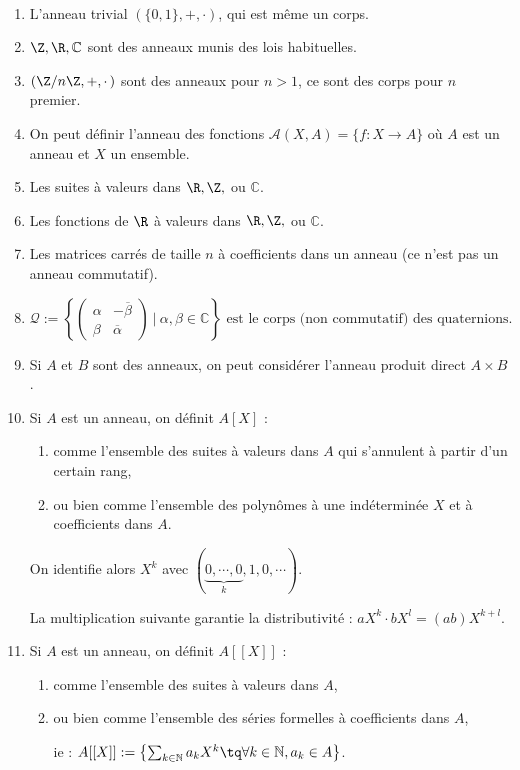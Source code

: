 \begin{example}[Exemples]\ 

\begin{enumerate}
 \item L'anneau trivial $(\{0,1\},+,\cdotp)$, qui est même un corps.
\item $\Z, \R, \mathbb{C}$ sont des anneaux munis des lois habituelles.
\item $(\Z / n\Z, +,\cdotp)$ sont des anneaux pour $n > 1$, ce sont des corps
pour $n$ premier.
\item On peut définir l'anneau des fonctions $\mathcal{A}(X,A) =
\{f:X\rightarrow A\}$ où $A$ est un
anneau et $X$ un ensemble.
\item Les suites à valeurs dans $\R, \Z,$ ou $ \mathbb{C}$.
\item Les fonctions de $\R$ à valeurs dans $\R, \Z,$ ou $\mathbb{C}$.
\item Les matrices carrés de taille $n$ à coefficients dans un anneau (ce n'est
pas un anneau commutatif).
\item \begin{displaymath}
       \mathcal{Q} := \left\lbrace \begin{pmatrix}
                               \alpha & -\overline{\beta} \\
                               \beta  & \overline{\alpha}
                              \end{pmatrix} \ \Big|\  \alpha,\beta
\in\mathbb{C} \right\rbrace \text{ est le corps (non commutatif) des
quaternions.}
      \end{displaymath}
\item Si $A$ et $B$ sont des anneaux, on peut considérer l'anneau produit
direct $A\times B$.
\item Si $A$ est un anneau, on définit $A[X]$ :
 \begin{enumerate}
  \item comme l'ensemble des suites à  valeurs dans $A$ qui s'annulent à partir
  d'un certain rang,
  \item  ou bien comme  l'ensemble des polynômes à une indéterminée
  $X$ et à coefficients dans $A$.
  \end{enumerate}
On identifie alors $X^k$ avec $(\underbrace{0,\cdots,0}_{k},1,0,\cdots)$.

La multiplication suivante garantie la distributivité : $aX^k \cdotp bX^l =
(ab)X^{k+l}$.
\item Si $A$ est un anneau, on définit $A\left[\left[X\right]\right]$ :
 \begin{enumerate}
  \item comme l'ensemble des suites à  valeurs dans $A$,
  \item  ou bien comme l'ensemble des séries formelles à coefficients
dans $A$,
  
ie : $A[[X]] := \left\lbrace\sum_{k\in\mathbb{N}}a_kX^k \tq \forall k \in
\mathbb{N},
a_k \in A\right\rbrace$.
  \end{enumerate}
\end{enumerate}
\end{example}

